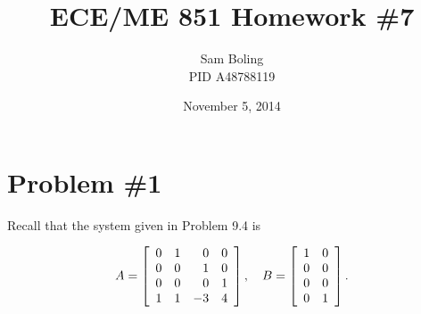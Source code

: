 \documentclass{article}
\title{ECE/ME 851 Homework \#7}
\date{November 5, 2014}
\author{Sam Boling \\ PID A48788119}
\begin{document}
\maketitle

\section*{Problem \#1}
Recall that the system given in Problem 9.4 is

$$
A =
\left[\begin{array}{r r r r}
  0 & 1 &  0 & 0 \\
  0 & 0 &  1 & 0 \\
  0 & 0 &  0 & 1 \\
  1 & 1 & -3 & 4
\end{array}\right], \quad
B =
\left[\begin{array}{r r}
  1 & 0 \\
  0 & 0 \\
  0 & 0 \\
  0 & 1
\end{array}\right].
$$
\end{document}
